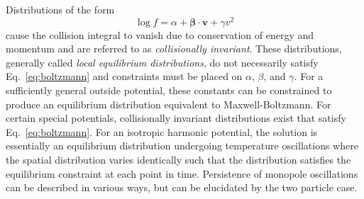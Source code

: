 \documentclass[%
 reprint,
 amsmath,amssymb,
 aps,
]{revtex4-1}
\begin{document}
Distributions of the form
\begin{equation}
\log f = \alpha + \mathbf{\beta}\cdot\mathbf{v}+\gamma v^2
\label{eq:collisioninvariant}
\end{equation}
cause the collision integral to vanish due to conservation of energy and momentum and are referred to as \textit{collisionally invariant}. These distributions, generally called \textit{local equilibrium distributions}, do not necessarily satisfy Eq.~\ref{eq:boltzmann} and constraints must be placed on $\alpha$, $\beta$, and $\gamma$. For a sufficiently general outside potential, these constants can be constrained to produce an equilibrium distribution equivalent to Maxwell-Boltzmann. For certain special potentials, collisionally invariant distributions exist that satisfy Eq.~\ref{eq:boltzmann}. For an isotropic harmonic potential, the solution is essentially an equilibrium distribution undergoing temperature oscillations where the spatial distribution varies identically such that the distribution satisfies the equilibrium constraint at each point in time. Persistence of monopole oscillations can be described in various ways, but can be elucidated by the two particle case. 
\end{document}
